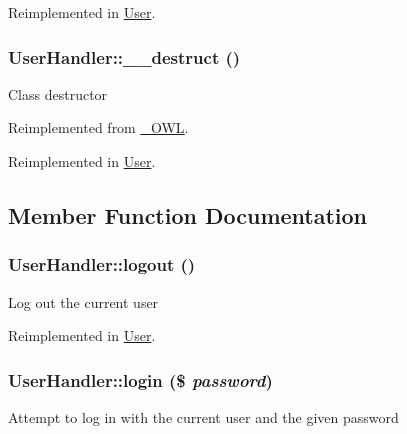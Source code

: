 Reimplemented in \hyperlink{classUser_b8a717f17626301cc8b7815a43ea5b5b}{User}.\hypertarget{classUserHandler_3e1f6381ed79caf6e1a255fb0a9cc386}{
\subsubsection{\setlength{\rightskip}{0pt plus 5cm}UserHandler::\_\-\_\-destruct ()}}
\label{classUserHandler_3e1f6381ed79caf6e1a255fb0a9cc386}


Class destructor 

Reimplemented from \hyperlink{class__OWL_44fd2222476a3109286cc82d92b6bbcc}{\_\-OWL}.

Reimplemented in \hyperlink{classUser_ccd20149a7414612c1505e022eb63ffc}{User}.

\subsection{Member Function Documentation}
\hypertarget{classUserHandler_8000feaceda9d3c37fc56b6d1969b8f7}{
\subsubsection{\setlength{\rightskip}{0pt plus 5cm}UserHandler::logout ()}}
\label{classUserHandler_8000feaceda9d3c37fc56b6d1969b8f7}


Log out the current user 

Reimplemented in \hyperlink{classUser_06ed977c877b02b420233d4f18a6a668}{User}.\hypertarget{classUserHandler_7a0b269a54d9430f48d6490c1fe14ecd}{
\subsubsection{\setlength{\rightskip}{0pt plus 5cm}UserHandler::login (\$ {\em password})}}
\label{classUserHandler_7a0b269a54d9430f48d6490c1fe14ecd}


Attempt to log in with the current user and the given password

